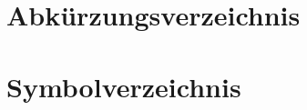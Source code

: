 \documentclass[
12pt,
oneside,
openright,
listof = totoc,
bibliography = totoc,
index = totoc]{scrreprt}
\begin{document}

	

	\clearpage

	
	\clearpage


    \tableofcontents
	\clearpage

	\listoffigures
	\clearpage

	\listoftables
	\clearpage

	\clearpage

	\chapter*{Abkürzungsverzeichnis}
	
	\clearpage
	\chapter*{Symbolverzeichnis}
	
	\clearpage

	
	
	
	
	
	


	\setcounter{page}{5}

	\printbibliography
	\clearpage

	\renewcommand\thechapter{\Alph{chapter}}
	\setcounter{chapter}{0}
	

	
\end{document}
